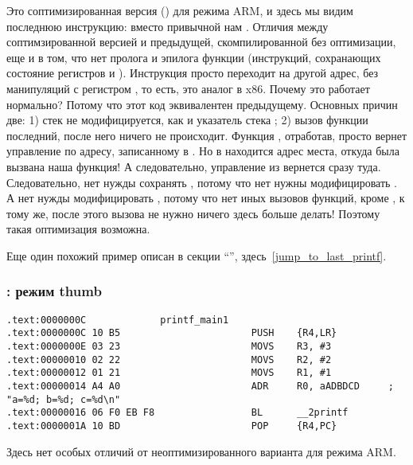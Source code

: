 Это соптимизированная версия (\Othree) для режима ARM, и здесь мы видим последнюю инструкцию:  вместо привычной
нам . 
Отличия между соптимзированной версией и предыдущей, скомпилированной без оптимизации, еще и в том, 
что нет пролога и эпилога функции (инструкций, сохранающих состояние регистров  и \LR).
Инструкция  просто переходит на другой адрес, без манипуляций с регистром \LR, то есть,
это аналог \JMP в x86.
Почему это работает нормально? Потому что этот код эквивалентен предыдущему.
Основных причин две: 1) стек не модифицируется, как и указатель стека \SP; 2) вызов функции \printf последний, 
после него ничего не происходит.
Функция \printf, отработав, просто вернет управление по адресу, записанному в \LR. Но в \LR находится адрес места,
откуда была вызвана наша функция! А следовательно, управление из \printf вернется сразу туда.
Следовательно, нет нужды сохранять \LR, потому что нет нужны модифицировать \LR. 
А нет нужды модифицировать \LR,
потому что нет иных вызовов функций, кроме \printf, к тому же, после этого вызова не нужно ничего здесь 
больше делать! Поэтому такая оптимизация возможна.

Еще один похожий пример описан в секции ``\SwitchCaseDefaultSectionName'', здесь~\ref{jump_to_last_printf}.

\subsubsection{\OptimizingKeil: режим thumb}

\begin{lstlisting}
.text:0000000C             printf_main1
.text:0000000C 10 B5                       PUSH    {R4,LR}
.text:0000000E 03 23                       MOVS    R3, #3
.text:00000010 02 22                       MOVS    R2, #2
.text:00000012 01 21                       MOVS    R1, #1
.text:00000014 A4 A0                       ADR     R0, aADBDCD     ; "a=%d; b=%d; c=%d\n"
.text:00000016 06 F0 EB F8                 BL      __2printf
.text:0000001A 10 BD                       POP     {R4,PC}
\end{lstlisting}

Здесь нет особых отличий от неоптимизированного варианта для режима ARM.


